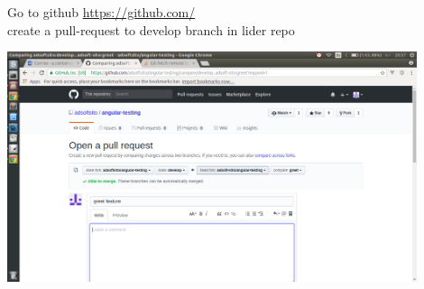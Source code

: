 \documentclass{beamer}
\begin{document}
\begin{frame}\frametitle{} 

\begin{block}{Go to github}
\url{https://github.com/} \\

create a pull-request to develop branch in lider repo
\end{block}

\begin{center}
\includegraphics[width=0.9\textwidth]{pull-request.png}
\end{center}


\end{frame}
\end{document}
